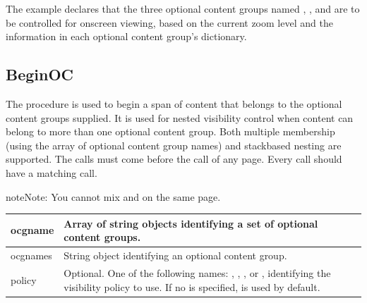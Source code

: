 \documentclass[letterpaper,12pt,english,openany,oneside]{sphinxmanual}
\begin{document}
The example declares that the three optional content groups named  ,  , and  are to be controlled for on\sphinxhyphen{}screen viewing, based on the current zoom level and the  information in each optional content group’s  dictionary.


\subsection{BeginOC}
\label{\detokenize{pdfmark_OC_Interface:beginoc}}
The  procedure is used to begin a span of content that belongs to the optional content groups supplied. It is used for nested visibility control when content can belong to more than one optional content group. Both multiple membership (using the array of optional content group names) and stack\sphinxhyphen{}based nesting are supported. The  calls must come before the  call of any page. Every  call should have a matching  call.

\begin{sphinxadmonition}{note}{Note:}
You cannot mix  and  on the same page.
\end{sphinxadmonition}
\label{\detokenize{pdfmark_OC_Interface:syntax-1}}

\begin{sphinxVerbatim}[commandchars=\\\{\}]
 
 
\end{sphinxVerbatim}
\label{\detokenize{pdfmark_OC_Interface:parameters-1}}


\begin{savenotes}\sphinxattablestart
\centering
{}\label{\detokenize{pdfmark_OC_Interface:section-1}}\nobreak
\begin{tabulary}{\linewidth}[t]{|T|T|}
\hline

ocgname
&
Array of string objects identifying a set of optional content groups.
\\
\hline
ocgnames
&
String object identifying an optional content group.
\\
\hline
policy
&
Optional. One of the following names:  ,  ,  , or  , identifying the visibility policy to use. If no  is specified,  is used by default.
\\
\hline
\end{tabulary}
\par
\sphinxattableend\end{savenotes}
\end{document}
